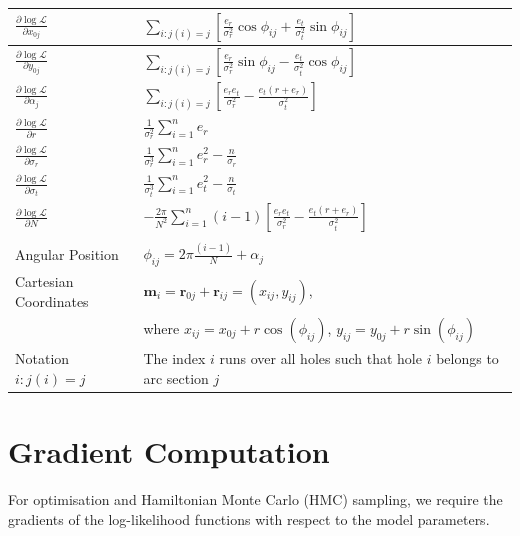 \documentclass[11pt]{article}
\begin{document}
\begin{table}[h!]
\begin{tabular}{>{\raggedright\arraybackslash}p{4cm} >{\raggedright\arraybackslash}p{10cm}}
\midrule
$\frac{\partial \log \mathcal{L}}{\partial x_{0j}}$ &
$\sum_{i: j(i)=j} \left[ \frac{e_r}{\sigma_r^2} \cos \phi_{ij} + \frac{e_t}{\sigma_t^2} \sin \phi_{ij} \right]$ \\
\midrule
$\frac{\partial \log \mathcal{L}}{\partial y_{0j}}$ &
$\sum_{i: j(i)=j} \left[ \frac{e_r}{\sigma_r^2} \sin \phi_{ij} - \frac{e_t}{\sigma_t^2} \cos \phi_{ij} \right]$ \\
\midrule
$\frac{\partial \log \mathcal{L}}{\partial \alpha_j}$ &
$\sum_{i: j(i)=j} \left[ \frac{e_r e_t}{\sigma_r^2} - \frac{e_t (r + e_r)}{\sigma_t^2} \right]$ \\
\midrule
$\frac{\partial \log \mathcal{L}}{\partial r}$ &
$\frac{1}{\sigma_r^2} \sum_{i=1}^n e_r$ \\
\midrule
$\frac{\partial \log \mathcal{L}}{\partial \sigma_r}$ &
$\frac{1}{\sigma_r^3} \sum_{i=1}^n e_r^2 - \frac{n}{\sigma_r}$ \\
\midrule
$\frac{\partial \log \mathcal{L}}{\partial \sigma_t}$ &
$\frac{1}{\sigma_t^3} \sum_{i=1}^n e_t^2 - \frac{n}{\sigma_t}$ \\
\midrule
$\frac{\partial \log \mathcal{L}}{\partial N}$ &
$-\frac{2\pi}{N^2} \sum_{i=1}^n (i-1) \left[ \frac{e_r e_t}{\sigma_r^2} - \frac{e_t (r + e_r)}{\sigma_t^2} \right]$ \\
\midrule
\multicolumn{2}{c}{\textbf{Notations}} \\
\midrule
Angular Position &
$\phi_{ij} = 2\pi \frac{(i-1)}{N} + \alpha_j$ \\
\midrule
Cartesian Coordinates &
$\mathbf{m}_{i} = \mathbf{r}_{0j} + \mathbf{r}_{ij} = (x_{ij}, y_{ij})$, \\
& where $x_{ij} = x_{0j} + r \cos(\phi_{ij})$, $y_{ij} = y_{0j} + r \sin(\phi_{ij})$ \\
\midrule
Notation $i: j(i)=j$ &
The index $i$ runs over all holes such that hole $i$ belongs to arc section $j$ \\
\bottomrule
\end{tabular}
\label{tab:ll}
\end{table}



\section{Gradient Computation}

For optimisation and Hamiltonian Monte Carlo (HMC) sampling, we require the gradients of the log-likelihood functions with respect to the model parameters.
\end{document}
